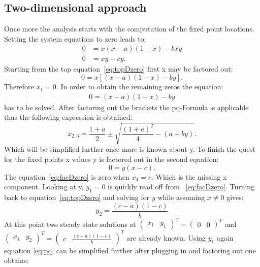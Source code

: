 \subsection{Two-dimensional approach}
Once more the analysis starts with the computation of the fixed point locations. Setting the system equations to zero leads to:
\begin{align}
0 &= x(x-a)(1-x) - bxy \label{eq:topDzero} \\
0 &= xy - cy.
\end{align}
Starting from the top equation~\ref{eq:topDzero} first x may be factored out:
\begin{equation}
0 = x[(x-a)(1-x) - by].
\end{equation}
Therefore $x_1 = 0$. In order to obtain the remaining zeros the equation:
\begin{align}
0 = (x - a)(1 - x) - by
\end{align} 
has to be solved. After factoring out the brackets the pq-Formula is applicable thus the following expression is obtained:
\begin{equation}
x_{2,3} = \frac{1+a}{2} \pm \sqrt{\frac{(1+a)^2}{4} - (a + by)}.
\label{eq:pq}
\end{equation}
Which will be simplified further once more is known about y. To finish the quest for the fixed points x values y is factored out in the second equation:
\begin{equation}
0 = y (x - c).
\label{eq:facDzero}
\end{equation}
The equation~\ref{eq:facDzero} is zero when $x_4 = c$. Which is the missing x component. Looking at y, $y_1 = 0$ is quickly read off from ~\ref{eq:facDzero}. Turning back to equation~\ref{eq:topDzero} and solving for $y$ while assuming $x \ne 0$ gives:
\begin{equation}
y_2 = \frac{(c - a)(1 - c)}{b}
\end{equation}
At this point two steady state solutions at $\begin{pmatrix} x_1 & y_1 \end{pmatrix}^T = \begin{pmatrix} 0 & 0 \end{pmatrix}^T$ and $\begin{pmatrix} x_4 & y_2 \end{pmatrix}^T = \begin{pmatrix} c & \frac{(c -a )(1-c)}{b} \end{pmatrix}^T$ are already known. Using $y_1$ again equation \ref{eq:pq} can be simplified further after plugging in and factoring out one obtains:

